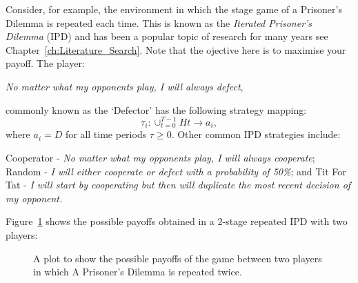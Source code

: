 Consider, for example, the environment in which the stage game of a Prisoner's
Dilemma is repeated each time. This is known as the \emph{Iterated Prisoner's
Dilemma} (IPD) and has been a popular topic of research for many years see
Chapter~\ref{ch:Literature_Search}. Note that the ojective here is to maximise
your payoff. The player: 
\begin{center}
    \textit{No matter what my opponents play, I will always defect},
\end{center}
commonly known as the `Defector' has the following strategy mapping:
\[
    \tau_{i} : \cup_{t = 0}^{T-1}{H{t}} \to a_{i},
\]
where \(a_{i}=D\) for all time periods \(\tau \ge 0\). Other common IPD
strategies include: 
\begin{center}
    Cooperator - \textit{No matter what my opponents play, I will always
    cooperate};
    Random - \textit{I will either cooperate or defect with a probability of
    50\%}; and
    \newline Tit For Tat - \textit{I will start by cooperating but then will 
    duplicate the most recent decision of my opponent.}
\end{center}

Figure~\ref{fig:2-stage_payoff_plot} shows the possible payoffs obtained in a 
2-stage repeated IPD with two players:

\begin{figure}\label{fig:2-stage_payoff_plot}
    \caption{A plot to show the possible payoffs of the game between two players in which A Prisoner's Dilemma is repeated twice.}
\end{figure}


